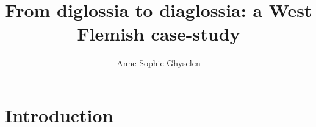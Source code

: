 \documentclass[output=paper]{LSP/langsci}
\author{Anne-Sophie Ghyselen\affiliation{Ghent University}}
\title{From diglossia to diaglossia: a West Flemish case-study}
\begin{document}
\newcommand{\ghysvara}{\cellcolor{red!36}[-st,+ypr]~~}
\newcommand{\ghysvarb}{\cellcolor{red!18}[+st,+ypr]~~}
\newcommand{\ghysvarc}{\cellcolor{blue!36}[-st,-ypr]~~}
\newcommand{\ghysvard}{\cellcolor{blue!18}[+st,-ypr]~~}

\newcommand{\tabitem}{{\textbullet}~~}
 
 

\section{Introduction}
\end{document}
